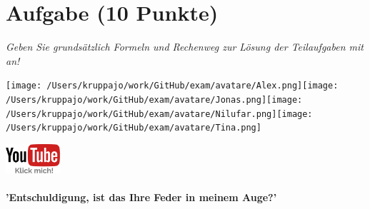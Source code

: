 \documentclass[a4paper, 9pt]{scrartcl}\usepackage[]{graphicx}\usepackage[]{xcolor}
\begin{document}

\clearpage

\section{Aufgabe \hfill (10 Punkte)}

\textit{Geben Sie grundsätzlich Formeln und Rechenweg zur Lösung der Teilaufgaben mit an!} \\[1Ex]
 

 
\ifcollection
\begin{flushright}
\tiny\vspace{-3Ex}
\textbf{\examinhaltstart}
\exammodulemathstat
\vspace{-4Ex}
\end{flushright}
\begin{minipage}[t]{0.5\textwidth}
\texttt{[image: /Users/kruppajo/work/GitHub/exam/avatare/Alex.png]}\hspace{-4mm}\texttt{[image: /Users/kruppajo/work/GitHub/exam/avatare/Jonas.png]}\hspace{-4mm}\texttt{[image: /Users/kruppajo/work/GitHub/exam/avatare/Nilufar.png]}\hspace{-4mm}\texttt{[image: /Users/kruppajo/work/GitHub/exam/avatare/Tina.png]}
\end{minipage}
\begin{minipage}[t]{0.5\textwidth}
\hfill
\href{https://youtu.be/n451XnhtSh4}{\includegraphics[width = 2cm]{img/youtube}}
\end{minipage}
\fi



\ifcollection
\paragraph{'Entschuldigung, ist das Ihre Feder in meinem Auge?'}
\fi
\end{document}
